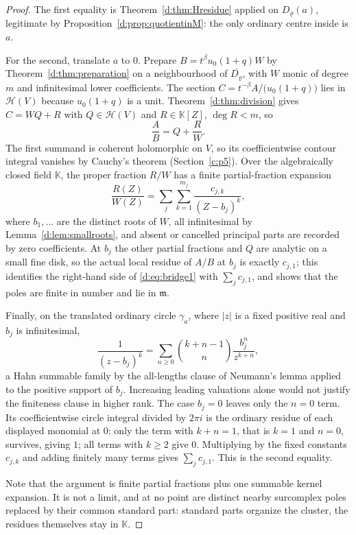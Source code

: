 \documentclass[11pt,a4paper]{article}
\numberwithin{equation}{section}
\theoremstyle{definition}
\theoremstyle{remark}
\theoremstyle{plain}
\newcommand{\K}{\mathbb K}
\newcommand{\mm}{\mathfrak m}
\newcommand{\tm}{t}
\newcommand{\Hc}{\mathcal H}
\newcommand{\abs}[1]{\lvert #1\rvert}
\begin{document}
\begin{proof}
The first equality is Theorem~\ref{d:thm:Hresidue} applied on
$D_\varrho(a)$, legitimate by Proposition~\ref{d:prop:quotientinM}: the
only ordinary centre inside is $a$.

For the second, translate $a$ to $0$.  Prepare
$B=\tm^{\beta}u_0(1+q)W$ by Theorem~\ref{d:thm:preparation} on a
neighbourhood of $\overline{D_\varrho}$, with $W$ monic of degree $m$
and infinitesimal lower coefficients.  The section
$C=\tm^{-\beta}A/\bigl(u_0(1+q)\bigr)$ lies in $\Hc(V)$ because
$u_0(1+q)$ is a unit.  Theorem~\ref{d:thm:division} gives
$C=WQ+R$ with $Q\in\Hc(V)$ and $R\in\K[Z]$, $\deg R<m$, so
\begin{equation}\label{d:eq:meromdecomp}
 \frac AB=Q+\frac RW .
\end{equation}
The first summand is coherent holomorphic on $V$, so its coefficientwise
contour integral vanishes by Cauchy's theorem (Section~\ref{c:p5}).  Over the
algebraically closed field $\K$, the proper fraction $R/W$ has a finite
partial-fraction expansion
\[
 \frac{R(Z)}{W(Z)}=\sum_{j}\sum_{k=1}^{m_j}
   \frac{c_{j,k}}{(Z-b_j)^{k}},
\]
where $b_1,\dots$ are the distinct roots of $W$, all infinitesimal by
Lemma~\ref{d:lem:smallroots}, and absent or cancelled principal parts
are recorded by zero coefficients.  At $b_j$ the other partial
fractions and $Q$ are analytic on a small fine disk, so the actual local
residue of $A/B$ at $b_j$ is exactly $c_{j,1}$; this identifies the
right-hand side of \eqref{d:eq:bridge1} with $\sum_jc_{j,1}$, and shows
that the poles are finite in number and lie in $\mm$.

Finally, on the translated ordinary circle $\gamma_a$, where $\abs z$ is a fixed
positive real and $b_j$ is infinitesimal,
\begin{equation}\label{d:eq:kernelexp}
 \frac1{(z-b_j)^{k}}
 =\sum_{n\ge0}\binom{k+n-1}{n}\frac{b_j^{n}}{z^{k+n}} ,
\end{equation}
a Hahn summable family by the all-lengths clause of Neumann's lemma
applied to the positive support of $b_j$. Increasing leading valuations
alone would not justify the finiteness clause in higher rank. The case
$b_j=0$ leaves only the $n=0$ term.  Its coefficientwise circle
integral divided by $2\pi i$ is the ordinary residue of each displayed
monomial at $0$: only the term with $k+n=1$, that is $k=1$ and $n=0$,
survives, giving $1$; all terms with $k\ge2$ give $0$.  Multiplying by
the fixed constants $c_{j,k}$ and adding finitely many terms gives
$\sum_jc_{j,1}$.  This is the second equality.

Note that the argument is finite partial fractions plus one summable
kernel expansion.  It is not a limit, and at no point are distinct
nearby surcomplex poles replaced by their common standard part:
standard parts organize the cluster, the residues themselves stay in
$\K$.
\end{proof}
\end{document}
